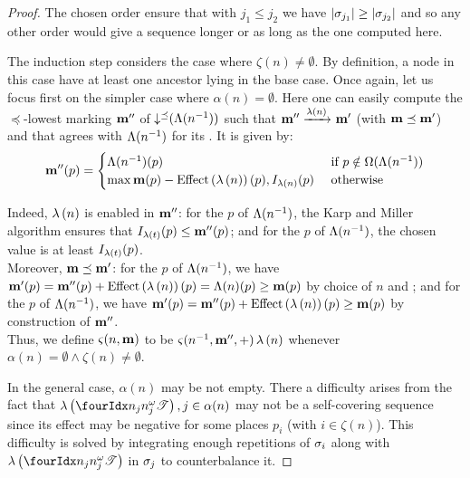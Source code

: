 \begin{proof}
  The chosen order ensure that with $j_1 \leq j_2$ we have $\card{\seqt_{j_1}} \geq \card{\seqt_{j_2}}$ and so any other order would give a sequence longer or as long as the one computed here.


  The induction step considers the case where $\zeta(n) \neq \emptyset$.
  By definition, a node in this case have at least one ancestor lying in the base case.
  Once again, let us focus first on the simpler case where $\alpha(n) = \emptyset$.
  Here one can easily compute the $\preceq$-lowest marking $\mathbf{m}''$ of $\operatorname{\downarrow^\preceq}(\operatorname{\Lambda}(n^{-1}))$ such that $\mathbf{m}'' \xrightarrow{\operatorname{\lambda}\left({n}\right)}_{} \mathbf{m}'$ (with $\mathbf{m} \preceq \mathbf{m}'$) and that agrees with $\operatorname{\Lambda}(n^{-1})$ for its \noplaces. It is given by:
  \[
    \mar''(p) = \begin{cases}
      \lab{\parent{n}}(p)
        &\text{ if } p \notin \op{\lab{\parent{n}}} \\
      \max{\mar(p) - \effect{\labt{n}}(p), I_{\labt{n}}(p)}
        &\text{ otherwise}
    \end{cases}
  \]

  Indeed, %
  $\operatorname{\lambda}\left({n}\right)$ is enabled in $\mathbf{m}''$:
  for the \noplaces $p$ of $\operatorname{\Lambda}(n^{-1})$, the Karp and Miller algorithm ensures that $I_{\operatorname{\lambda}\left({t}\right)}(p) \leq \mathbf{m}''(p)$;
  and for the \oplaces $p$ of $\operatorname{\Lambda}(n^{-1})$, the chosen value is at least $I_{\operatorname{\lambda}\left({t}\right)}(p)$.\\
  Moreover, %
  $\mathbf{m} \preceq \mathbf{m}'$:
  for the \noplaces $p$ of $\operatorname{\Lambda}(n^{-1})$, we have $\mar'(p) = \mar''(p) + \effect{\labt{n}}(p) = \lab{n}(p) \geq \mar(p)$ by choice of $n$ and \mar;
  and for the \oplaces $p$ of $\operatorname{\Lambda}(n^{-1})$, we have $\mar'(p) = \mar''(p) + \effect{\labt{n}}(p) \geq \mar(p)$ by construction of $\mathbf{m}''$.\\
  Thus, we define
  $\operatorname{\varsigma}(n,\mathbf{m})$ to be $\operatorname{\varsigma}(n^{-1}, \mathbf{m}'',+) \operatorname{\lambda}\left({n}\right)$
  whenever
  $\alpha(n) = \emptyset \wedge \zeta(n) \neq \emptyset$.

  In the general case, $\alpha(n)$ may be not empty.
  There a difficulty arises from the fact that $\labt{\treepath[n_j]{n^\omega_j}}, j \in \alpha(n)$ may not be a self-covering sequence since its effect may be negative for some places $p_i$ (with $i \in \zeta(n)$).
  This difficulty is solved by integrating enough repetitions of $\seqt_i$ along with $\labt{\treepath[n_j]{n^\omega_j}}$ in $\seqt_j$ to counterbalance it.


\end{proof}

